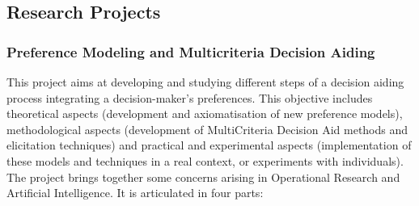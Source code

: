 %
%

\subsection{Research Projects}


\subsubsection{Preference Modeling and Multicriteria Decision Aiding}

This project aims at developing and studying different steps of a decision aiding process integrating a decision-maker's preferences. This objective includes theoretical aspects (development and axiomatisation of new preference models), methodological aspects (development of MultiCriteria Decision Aid methods and elicitation techniques) and practical and experimental aspects (implementation of these models and techniques in a real context, or experiments with individuals). The project brings together some concerns arising in Operational Research and Artificial Intelligence. It is articulated in four parts: 

